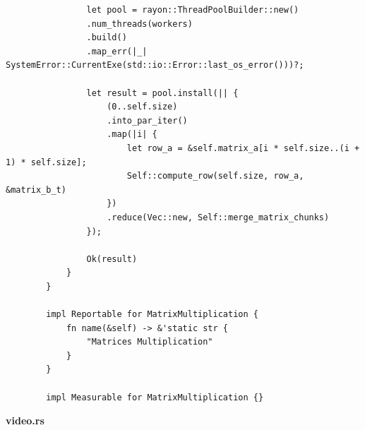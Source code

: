 \documentclass[14pt, a4paper]{extreport}
\begin{document}
\begin{verbatim}
				let pool = rayon::ThreadPoolBuilder::new()
				.num_threads(workers)
				.build()
				.map_err(|_| SystemError::CurrentExe(std::io::Error::last_os_error()))?;
				
				let result = pool.install(|| {
					(0..self.size)
					.into_par_iter()
					.map(|i| {
						let row_a = &self.matrix_a[i * self.size..(i + 1) * self.size];
						Self::compute_row(self.size, row_a, &matrix_b_t)
					})
					.reduce(Vec::new, Self::merge_matrix_chunks)
				});
				
				Ok(result)
			}
		}
		
		impl Reportable for MatrixMultiplication {
			fn name(&self) -> &'static str {
				"Matrices Multiplication"
			}
		}
		
		impl Measurable for MatrixMultiplication {}
	\end{verbatim}
	
	\textbf{video.rs}
	
\end{document}
